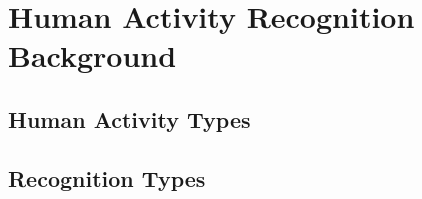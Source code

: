 \begin{comment}

According to Luria, purposeful movement is the output of multilevel planning process. It presumes certain goal to be accomplished. 

- The first stage is the general planning, this level answers the question why and how some action should be performed. 

- On the second level, concrete motion patterns are generated on the basis of general plan. These motion patterns are referred as motion melodies. Motion melodies are the sequences of the motions, ordered in time, which should allow accomplishment of the goal. 

- On the third level ”orders” are generated to the direction of the spinal cord. On this level, melody of the motions is implemented. 

The present work is targeted towards detecting disorders on the second and third levels.  Digital Luria’s alternating series test are selected for this purpose.

- The first Luria’s alternating series test: tracing the series requires one to follow the periodic pattern. Tested individual asked to follow periodic pattern, for example sinusoidal line see ”Fig 5” or the line consisting of the strait segments ”Fig 4” (here and after referred as PL - line), with the pen. 

- The second Luria’s alternating test: coping the series requires one to copy periodic pattern. Pattern is drawn on top of the paper and tested individual is asked to draw the same on the bottom of the paper see ”Fig 2 and 3”. 

- The third test: continuing the series, requires one to continue periodic pattern (PL line). Few segments of the pattern are drawn on the paper and tested individual is asked to continue the pattern see ”Fig 1”. 

In a non digitalized case, the neurologist or psychiatrist does assessment visually. If all the tests are problematic for the tested individual then the disorder is most likely on the third level where motion melody is outputted to the spine. Some of the Luria’s tests are quite simple and do not require to generate complicated motion melodies. If the problem appears only during the third (more complicated test), and either do not appear at all or less severe for a simpler tests, then most likely disorder is on the second level where motion melodies are generated.

\end{comment}


\section{Human Activity Recognition Background}

\subsection{Human Activity Types}

\subsection{Recognition Types}
